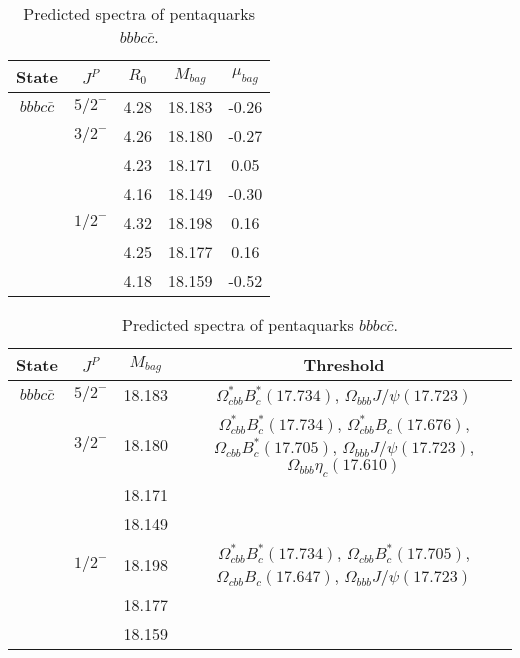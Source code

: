 \documentclass[prd,twocolumn,floatfix,nofootinbib]{revtex4}
\begin{document}
\renewcommand{\tabcolsep}{0.5cm}
\renewcommand{\arraystretch}{1.2}
\begin{table*}[!htbp]
    \caption{Predicted spectra of pentaquarks $bbbc\bar{c}$.}
    \begin{tabular}{ccccc}
        \hline\hline
        {\rm State} &$J^{P}$ &$R_{0}$ &$M_{bag}$ &$\mu_{bag}$ \\ \hline
        ${bbbc\bar{c}}$
            &${5/2}^{-}$    &4.28   &18.183 &-0.26 \\
            &${3/2}^{-}$    &4.26   &18.180 &-0.27 \\
            &               &4.23   &18.171 &0.05 \\
            &               &4.16   &18.149 &-0.30 \\
            &${1/2}^{-}$    &4.32   &18.198 &0.16 \\
            &               &4.25   &18.177 &0.16 \\
            &               &4.18   &18.159 &-0.52 \\
        \hline\hline
    \end{tabular}
\end{table*}

\renewcommand{\tabcolsep}{0.5cm}
\renewcommand{\arraystretch}{1.2}
\begin{table*}[!htbp]
    \caption{Predicted spectra of pentaquarks $bbbc\bar{c}$.}
    \begin{tabular}{cccc}
        \hline\hline
        {\rm State} &$J^{P}$ &$M_{bag}$ &Threshold \\ \hline
        ${bbbc\bar{c}}$
            &${5/2}^{-}$    &18.183 &$\Omega^{\ast}_{cbb} B^{\ast}_{c}(17.734)$, $\Omega_{bbb} J/\psi(17.723)$ \\
            &${3/2}^{-}$    &18.180 &$\Omega^{\ast}_{cbb} B^{\ast}_{c}(17.734)$, $\Omega^{\ast}_{cbb} B_{c}(17.676)$, $\Omega_{cbb} B^{\ast}_{c}(17.705)$, $\Omega_{bbb} J/\psi(17.723)$, $\Omega_{bbb} \eta_{c}(17.610)$ \\
            &               &18.171 & \\
            &               &18.149 & \\
            &${1/2}^{-}$    &18.198 &$\Omega^{\ast}_{cbb} B^{\ast}_{c}(17.734)$, $\Omega_{cbb} B^{\ast}_{c}(17.705)$, $\Omega_{cbb} B_{c}(17.647)$, $\Omega_{bbb} J/\psi(17.723)$ \\
            &               &18.177 & \\
            &               &18.159 & \\
        \hline\hline
    \end{tabular}
\end{table*}
\end{document}
